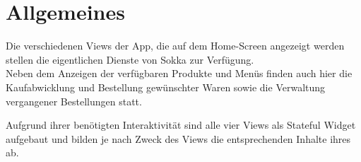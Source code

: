 \section{Allgemeines}

Die verschiedenen Views der App, die auf dem Home-Screen angezeigt werden stellen die eigentlichen
Dienste von Sokka zur Verfügung.\\
Neben dem Anzeigen der verfügbaren Produkte und Menüs finden auch hier die Kaufabwicklung und
Bestellung gewünschter Waren sowie die Verwaltung vergangener Bestellungen statt.

Aufgrund ihrer benötigten Interaktivität sind alle vier Views als Stateful Widget aufgebaut und
bilden je nach Zweck des Views die entsprechenden Inhalte ihres  ab.

